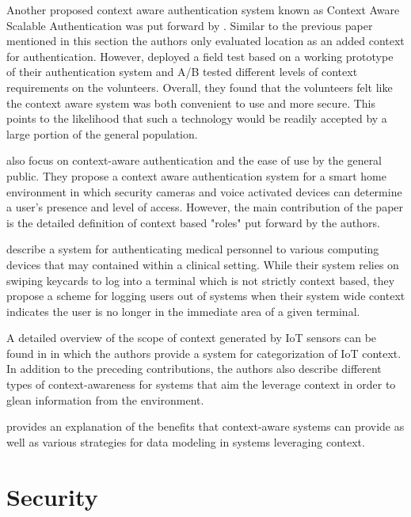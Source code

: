 \documentclass[11pt,journal]{IEEEtran}
\begin{document}
Another proposed context aware authentication system known as Context Aware Scalable Authentication was put forward by \citet{hayashi2013casa}.  Similar to the previous paper mentioned in this section the authors only evaluated location as an added context for authentication.  However, \citet{hayashi2013casa} deployed a field test based on a working prototype of their authentication system and A/B tested different levels of context requirements on the volunteers.  Overall, they found that the volunteers felt like the context aware system was both convenient to use and more secure.  This points to the likelihood that such a technology would be readily accepted by a large portion of the general population.

\citet{covington2002context} also focus on context-aware authentication and the ease of use by the general public.  They propose a context aware authentication system for a smart home environment in which security cameras and voice activated devices can determine a user's presence and level of access.  However, the main contribution of the paper is the detailed definition of context based "roles" put forward by the authors.

\citet{bardram2003context} describe a system for authenticating medical personnel to various computing devices that may contained within a clinical setting.  While their system relies on swiping keycards to log into a terminal which is not strictly context based, they propose a scheme for logging users out of systems when their system wide context indicates the user is no longer in the immediate area of a given terminal.

A detailed overview of the scope of context generated by IoT sensors can be found in \citet{Habib:2015} in which the authors provide a system for categorization of IoT context.  In addition to the preceding contributions, the authors also describe different types of context-awareness for systems that aim the leverage context in order to glean information from the environment.

\citet{strang2004context} provides an explanation of the benefits that context-aware systems can provide as well as various strategies for data modeling in systems leveraging context. 


\section{Security}
\end{document}
